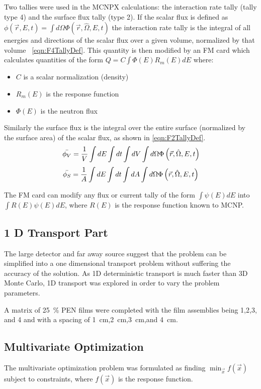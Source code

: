 Two tallies were used in the MCNPX calculations: the interaction rate tally (tally type 4) and the surface flux tally (type 2).
If the scalar flux is defined as $\phi(\vec{r},E,t)=\int d\Omega \Phi(\vec{r},\hat{\Omega},E,t)$ the  interaction rate tally is the integral of all energies and directions of the scalar flux over a given volume, normalized by that volume ~\eqref{eqn:F4TallyDef}.
This quantity is then modified by an FM card which calculates quantities of the form $Q = C \int {\Phi(E) R_m(E) dE }$ where:
\begin{itemize}
    \item $C$ is a scalar normalization (density)
    \item $R_m(E)$ is the response function
    \item $\Phi(E)$ is the neutron flux
\end{itemize}
Similarly the surface flux is the integral over the entire surface (normalized by the surface area) of the scalar flux, as shown in \eqref{eqn:F2TallyDef}.
\begin{align}
    \label{eqn:F4TallyDef}
    \bar{\phi_V} = \frac{1}{V}\int dE \int dt \int dV \int d\Omega \Phi \left ( \vec{r},\hat{\Omega},E,t \right )
\end{align}
\begin{align}
    \label{eqn:F2TallyDef}
    \bar{\phi_S} = \frac{1}{A}\int dE \int dt \int dA \int d\Omega \Phi \left ( \vec{r},\hat{\Omega},E,t \right )
\end{align}

The FM card can modify any flux or current tally of the form $\int \psi (E) dE$ into $\int R(E)\psi(E) dE$, where $R(E)$ is the response function known to MCNP.
\subsection{1 D Transport Part}
The large detector and far away source suggest that the problem can be simplified into a one dimensional transport problem without suffering the accuracy of the solution.
As 1D deterministic transport is much faster than 3D Monte Carlo, 1D transport was explored in order to vary the problem parameters.

A matrix of \SI{25}{\percent}  PEN films were completed with the film assemblies being 1,2,3, and 4 and with a spacing of \SI{1}{\centi\meter},\SI{2}{\centi\meter},\SI{3}{\centi\meter},and \SI{4}{\centi\meter}. 
\subsection{Multivariate Optimization}
\label{sec:MVOptimization}

The multivariate optimization problem was formulated as finding $\min_{\vec{x}} f (\vec{x})$ subject to constraints, where $f(\vec{x})$ is the response function.
